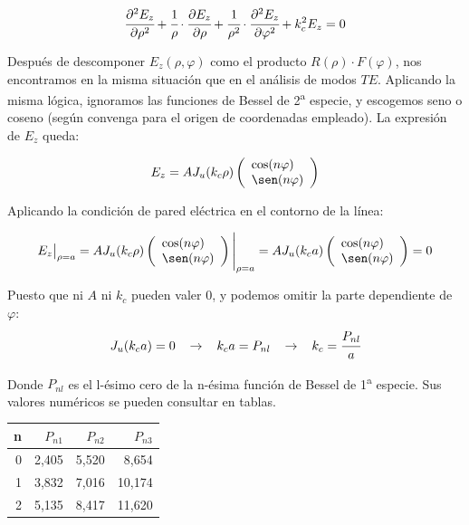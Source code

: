 \documentclass[12pt]{article}
\begin{document}
$$\cfrac{\partial^2 E_z}{\partial \rho^2} +\cfrac{1}{\rho}\cdot\cfrac{\partial E_z}{\partial \rho}+\cfrac{1}{\rho^2} \cdot\cfrac{\partial^2 E_z}{\partial \varphi^2} + k^2_c E_z = 0$$

Despu\'es de descomponer $E_z(\rho, \varphi)$ como el producto $R(\rho)\cdot F(\varphi)$, nos encontramos en la misma situaci\'on que en el an\'alisis de modos $TE$. Aplicando la misma l\'ogica, ignoramos las funciones de Bessel de 2\textsuperscript{a} especie, y escogemos seno o coseno (seg\'un convenga para el origen de coordenadas empleado). La expresi\'on de $E_z$ queda:

$$E_z = A J_u(k_c\rho)\left( \begin{array}{l}
        \cos(n\varphi) \\
        \sen(n\varphi)\end{array} \right)$$

Aplicando la condici\'on de pared el\'ectrica en el contorno de la l\'inea:

$$E_z\big|_{\rho = a} = A J_u(k_c\rho)\left( \begin{array}{l}
        \cos(n\varphi) \\
        \sen(n\varphi)\end{array} \right)\Bigg|_{\rho = a} = A J_u(k_c a)\left( \begin{array}{l}
        \cos(n\varphi) \\
        \sen(n\varphi)\end{array} \right)=0$$
        
Puesto que ni $A$ ni $k_c$ pueden valer 0, y podemos omitir la parte dependiente de $\varphi$:
$$J_u(k_c a) = 0 \hspace{0.3cm}\rightarrow \hspace{0.3cm} k_c a = P_{nl} \hspace{0.3cm}\rightarrow \hspace{0.3cm} k_c = \cfrac{P_{nl}}{a}$$

Donde $P_{nl}$ es el l-\'esimo cero de la n-\'esima funci\'on de Bessel de 1\textsuperscript{a} especie. Sus valores num\'ericos se pueden consultar en tablas.

\begin{center}
  \begin{tabular}{ r | r | r | r }
    n & $P_{n1}$ & $P_{n2}$ & $P_{n3}$\\ \hline
    0 & 2,405 & 5,520 & 8,654\\ \hline
    1 & 3,832 & 7,016 & 10,174\\ \hline
    2 & 5,135 & 8,417 & 11,620\\
  \end{tabular}
\end{center}
\end{document}
